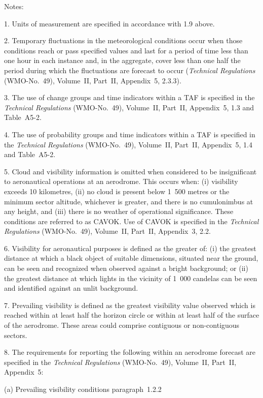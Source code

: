 Notes:

1. Units of measurement are specified in accordance with 1.9 above.

2. Temporary fluctuations in the meteorological conditions occur when those conditions reach or pass specified values and last for a period of time less than one hour in each instance and, in the aggregate, cover less than one half the period during which the fluctuations are forecast to occur (\emph{Technical Regulations} (WMO-No.~49), Volume~II, Part~II, Appendix~5, 2.3.3).

3. The use of change groups and time indicators within a TAF is specified in the \emph{Technical Regulations} (WMO-No.~49), Volume~II, Part~II, Appendix~5, 1.3 and Table~A5-2.

4. The use of probability groups and time indicators within a TAF is specified in the \emph{Technical Regulations} (WMO-No.~49), Volume~II, Part~II, Appendix~5, 1.4 and Table~A5-2.

5. Cloud and visibility information is omitted when considered to be insignificant to aeronautical operations at an aerodrome. This occurs when: (i) visibility exceeds 10 kilometres, (ii) no cloud is present below 1~500 metres or the minimum sector altitude, whichever is greater, and there is no cumulonimbus at any height, and (iii) there is no weather of operational significance. These conditions are referred to as CAVOK. Use of CAVOK is specified in the \emph{Technical Regulations} (WMO-No.~49), Volume~II, Part~II, Appendix~3, 2.2.

6. Visibility for aeronautical purposes is defined as the greater of: (i) the greatest distance at which a black object of suitable dimensions, situated near the ground, can be seen and recognized when observed against a bright background; or (ii) the greatest distance at which lights in the vicinity of 1~000 candelas can be seen and identified against an unlit background.

7. Prevailing visibility is defined as the greatest visibility value observed which is reached within at least half the horizon circle or within at least half of the surface of the aerodrome. These areas could comprise contiguous or non-contiguous sectors.

8. The requirements for reporting the following within an aerodrome forecast are specified in the \emph{Technical Regulations} (WMO-No.~49), Volume~II, Part~II, Appendix~5:

(a) Prevailing visibility conditions paragraph~1.2.2

